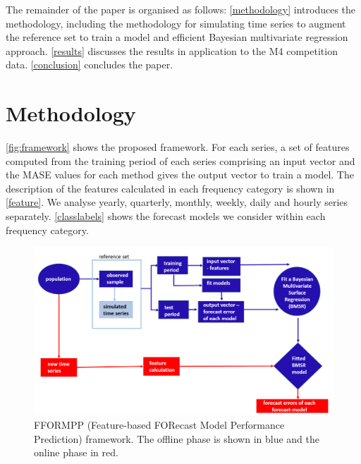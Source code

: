 \documentclass[11pt,a4paper,]{article}
\begin{document}
The remainder of the paper is organised as follows: \autoref{methodology} introduces the methodology, including the methodology for simulating time series to augment the reference set to train a model and efficient Bayesian multivariate regression approach. \autoref{results} discusses the results in application to the M4 competition data. \autoref{conclusion} concludes the paper.

\hypertarget{methodology}{%
\section{Methodology}\label{methodology}}

\autoref{fig:framework} shows the proposed framework. For each series, a set of features computed from the training period of each series comprising an input vector and the MASE values for each method gives the output vector to train a model. The description of the features calculated in each frequency category is shown in \autoref{feature}. We analyse yearly, quarterly, monthly, weekly, daily and hourly series separately. \autoref{classlabels} shows the forecast models we consider within each frequency category.

\begin{figure}[h]

{\centering \includegraphics[width=1.05\linewidth,height=0.4\textheight]{img/frameworkfformpp} 

}

\caption{FFORMPP (Feature-based FORecast Model Performance Prediction) framework. The offline phase is shown in blue and the online phase in red.}\label{fig:framework}
\end{figure}
\end{document}
